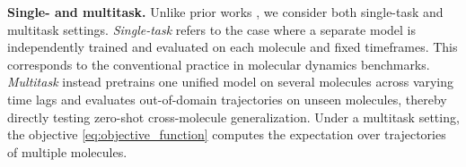 \textbf{Single- and multitask.}
\label{sec:st_and_mt}
Unlike prior works \cite{schreiner_implicit_2023, xu_equivariant_2024}, we consider both single-task and multitask settings. \textit{Single-task} refers to the case where a separate model is independently trained and evaluated on each molecule and fixed timeframes. This corresponds to the conventional practice in molecular dynamics benchmarks. \textit{Multitask} instead pretrains one unified model on several molecules across varying time lags and evaluates out-of-domain trajectories on unseen molecules, thereby directly testing zero-shot cross-molecule generalization. Under a multitask setting, the objective \eqref{eq:objective_function} computes the expectation over trajectories of multiple molecules. 









